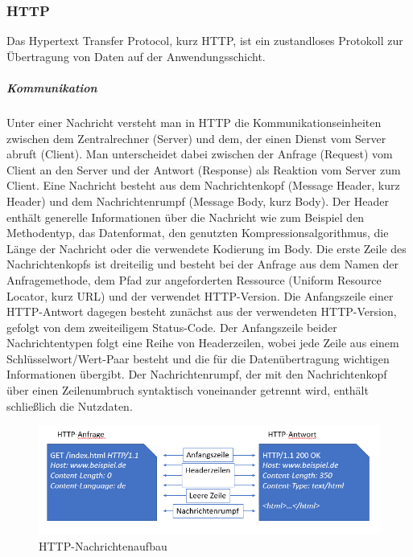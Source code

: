 \noindent
\subsubsection{HTTP}
Das Hypertext Transfer Protocol, kurz HTTP, ist ein zustandloses Protokoll zur Übertragung von Daten auf der Anwendungsschicht.

\noindent
\subparagraph{Kommunikation}
Unter einer Nachricht versteht man in HTTP die Kommunikationseinheiten zwischen dem Zentralrechner (Server) und dem, der einen Dienst vom Server abruft (Client). 
Man unterscheidet dabei zwischen der Anfrage (Request) vom Client an den Server und der Antwort (Response) als Reaktion vom Server zum Client. 
\newline
\noindent
Eine Nachricht besteht aus dem Nachrichtenkopf (Message Header, kurz Header) und dem Nachrichtenrumpf (Message Body, kurz Body). 
Der Header enthält generelle Informationen über die Nachricht wie zum Beispiel den Methodentyp, das Datenformat, den genutzten Kompressionsalgorithmus, die Länge der Nachricht oder die verwendete Kodierung im Body. 
\newline
\noindent
Die erste Zeile des Nachrichtenkopfs ist dreiteilig und besteht bei der Anfrage aus dem Namen der Anfragemethode, dem Pfad zur angeforderten Ressource (Uniform Resource Locator, kurz URL) und der verwendet HTTP-Version. Die Anfangszeile einer HTTP-Antwort dagegen besteht zunächst aus der verwendeten HTTP-Version, gefolgt von dem zweiteiligem Status-Code. 
Der Anfangszeile beider Nachrichtentypen folgt eine Reihe von Headerzeilen, wobei jede Zeile aus einem Schlüsselwort/Wert-Paar besteht und die für die Datenübertragung wichtigen Informationen übergibt. 
Der Nachrichtenrumpf, der mit den Nachrichtenkopf über einen Zeilenumbruch syntaktisch voneinander getrennt wird, enthält schließlich die Nutzdaten.
\newline

\begin{figure}[tbt]
\centering
\includegraphics[width=\textwidth]{images/netzwerkprotokolle_http.PNG}
\caption{HTTP-Nachrichtenaufbau}
\end{figure}

